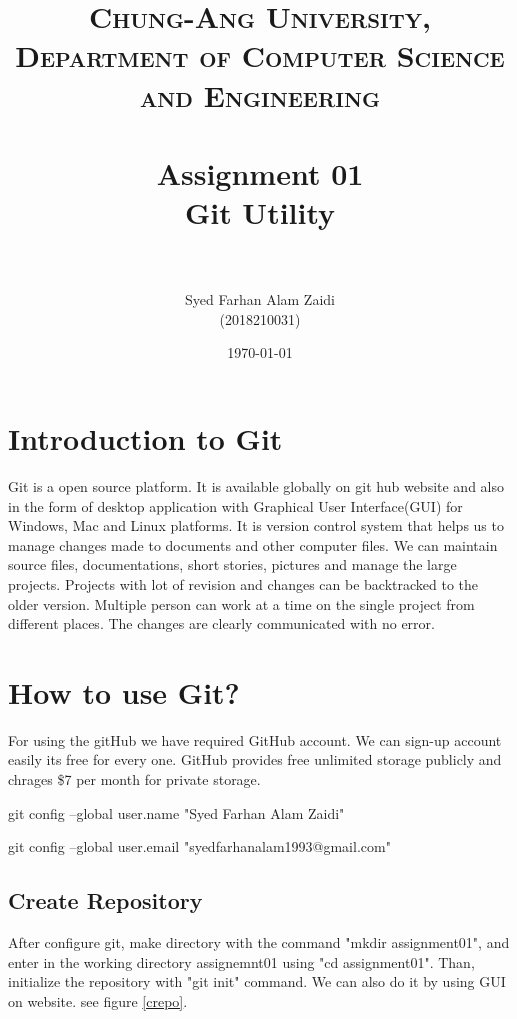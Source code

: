 \documentclass[paper=a4, fontsize=12pt]{scrartcl}
\title{	
\normalfont \normalsize 
\textsc{Chung-Ang University, Department of Computer Science and Engineering} \\ [25pt] %
\horrule{0.5pt} \\[0.4cm] %
\huge Assignment 01 \\
Git Utility\\  %
\horrule{1pt} \\[0.5cm] %
}
\author{Syed Farhan Alam Zaidi \\ (2018210031)} %
\date{\normalsize\today} %
\numberwithin{equation}{section} %
\numberwithin{figure}{section} %
\numberwithin{table}{section} %
\begin{document}
\maketitle %


\section{Introduction to Git}
\par Git is a open source platform. It is available globally on git hub website and also in the form of desktop application with Graphical User Interface(GUI) for Windows, Mac and Linux platforms.  It is version control system that helps us to manage changes made to documents and other computer files. We can maintain source files, documentations, short stories, pictures and manage the large projects. Projects with lot of revision and changes can be backtracked to the older version. Multiple person can work at a time on the single project from different places.  The changes are clearly communicated with no error.

\section{How to use Git?}
\par For using the gitHub we have required GitHub account. We can sign-up account easily its free for every one. GitHub provides free unlimited storage publicly and chrages \$7 per month for private storage.  

   \par git config --global user.name "Syed Farhan Alam Zaidi"
   \par  git config --global user.email "syedfarhanalam1993@gmail.com"

\subsection{Create Repository}
\par After configure git, make directory with the command "mkdir assignment01", and enter in the working directory assignemnt01 using "cd assignment01". Than, initialize the repository with "git init" command. We can also do it by using GUI on website. see figure \ref{crepo}.
\end{document}
